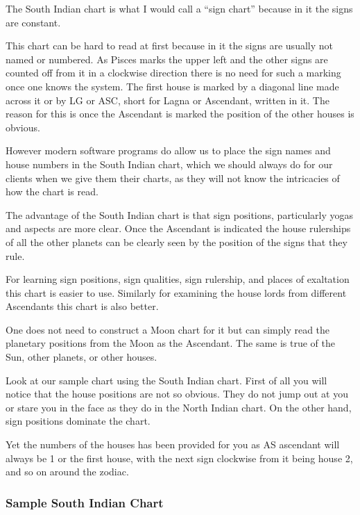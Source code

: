 The South Indian chart is what I would call a “sign chart” because in it the signs are constant.

 

This chart can be hard to read at first because in it the signs are usually not named or numbered. As Pisces marks the upper left and the other signs are counted off from it in a clockwise direction there is no need for such a marking once one knows the system. The first house is marked by a diagonal line made across it or by LG or ASC, short for Lagna or Ascendant, written in it. The reason for this is once the Ascendant is marked the position of the other houses is obvious.

 

However modern software programs do allow us to place the sign names and house numbers in the South Indian chart, which we should always do for our clients when we give them their charts, as they will not know the intricacies of how the chart is read.

 

The advantage of the South Indian chart is that sign positions, particularly yogas and aspects are more clear. Once the Ascendant is indicated the house rulerships of all the other planets can be clearly seen by the position of the signs that they rule.

 

For learning sign positions, sign qualities, sign rulership, and places of exaltation this chart is easier to use. Similarly for examining the house lords from different Ascendants this chart is also better.

 

One does not need to construct a Moon chart for it but can simply read the planetary positions from the Moon as the Ascendant. The same is true of the Sun, other planets, or other houses.

 

Look at our sample chart using the South Indian chart. First of all you will notice that the house positions are not so obvious. They do not jump out at you or stare you in the face as they do in the North Indian chart. On the other hand, sign positions dominate the chart.

 

Yet the numbers of the houses has been provided for you as AS ascendant will always be 1 or the first house, with the next sign clockwise from it being house 2, and so on around the zodiac.


\subsubsection{Sample South Indian Chart}

